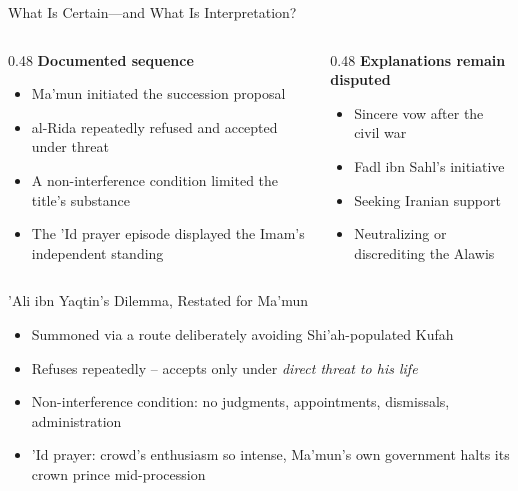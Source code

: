 \begin{frame}{What Is Certain—and What Is Interpretation?}
\begin{columns}[T]
  \begin{column}{0.48\textwidth}
    \textbf{Documented sequence}
    \begin{itemize}[itemsep=4pt]
      \item Ma'mun initiated the succession proposal
      \item al-Rida repeatedly refused and accepted under threat
      \item A non-interference condition limited the title's substance
      \item The 'Id prayer episode displayed the Imam's independent standing
    \end{itemize}
  \end{column}
  \begin{column}{0.48\textwidth}
    \textbf{Explanations remain disputed}
    \begin{itemize}[itemsep=4pt]
      \item Sincere vow after the civil war
      \item Fadl ibn Sahl's initiative
      \item Seeking Iranian support
      \item Neutralizing or discrediting the Alawis
    \end{itemize}
  \end{column}
\end{columns}
\vspace{0.2cm}
\end{frame}

\begin{frame}{'Ali ibn Yaqtin's Dilemma, Restated for Ma'mun}
\begin{itemize}[itemsep=5pt]
  \item Summoned via a route deliberately avoiding Shi'ah-populated Kufah
  \item Refuses repeatedly -- accepts only under \emph{direct threat to his life}
  \item Non-interference condition: no judgments, appointments, dismissals, administration
  \item 'Id prayer: crowd's enthusiasm so intense, Ma'mun's own government halts its crown prince mid-procession
\end{itemize}
\end{frame}

